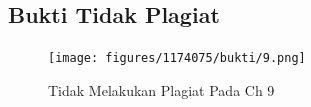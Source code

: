 \subsection{Bukti Tidak Plagiat}
\begin{figure}[H]
    \texttt{[image: figures/1174075/bukti/9.png]}
    \centering
    \caption{Tidak Melakukan Plagiat Pada Ch 9}
\end{figure}